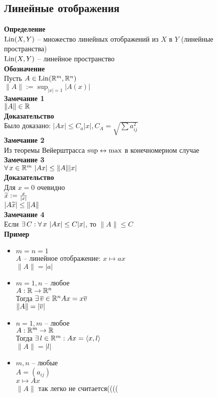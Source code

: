 \documentclass[12pt]{article}
\DeclareMathOperator{\Lin}{Lin}
\begin{document}
\subsection{Линейные отображения}
\textbf{Определение}\\
$\operatorname{Lin}(X, Y)$ -- множество линейных отображений из $X$ в $Y$ (линейные пространства)\\
$\operatorname{Lin}(X, Y)$ -- линейное пространство\\
\textbf{Обозначение}\\
Пусть $A \in \Lin(\Rset^m, \Rset^n)$\\
$\|A\| := \sup_{|x| = 1} |A(x)|$\\
\textbf{Замечание 1}\\
$\|A\| \in \mathbb{R}$\\
\textbf{Доказательство}\\
Было доказано: $|Ax| \leq C_a |x|, C_A = \sqrt{\sum a_{ij}^2}$\\
\textbf{Замечание 2}\\
Из теоремы Вейерштрасса $\sup \leftrightarrow \max$ в конечномерном случае\\
\textbf{Замечание 3}\\
$\forall\, x \in \mathbb{R}^m\ |Ax| \leq \|A\||x|$\\
\textbf{Доказательство}\\
Для $x=0$ очевидно\\
$\widetilde{x} := \frac{x}{|x|}$\\
$|A\widetilde{x}| \leq \|A\|$\\
\textbf{Замечание 4}\\
Если $\exists\, C: \forall\, x\ |Ax| \leq C|x|$, то $\|A\| \leq C$\\
\textbf{Пример}
\begin{itemize}
    \item $m=n=1$\\
    $A$ -- линейное отображение: $x \mapsto ax$\\
    $\|A\| = |a|$
    \item $m=1, n$ -- любое\\
    $A:\mathbb{R}\rightarrow \mathbb{R}^n$\\
    Тогда $\exists\, \overline v \in \mathbb{R}^n Ax = x\overline{v}$\\
    $\|A\| = |\overline v|$
    \item $n=1, m$ -- любое\\
    $A: \mathbb{R}^m \rightarrow \mathbb{R}$\\
    Тогда $\exists\, l \in \mathbb{R}^m: Ax=\langle x, l \rangle$\\
    $\|A\| = |l|$
    \item $m,n$ -- любые\\
    $A=(a_{ij})$\\
    $x \mapsto Ax$\\
    $\|A\|$ так легко не считается((((
\end{itemize}
\end{document}
